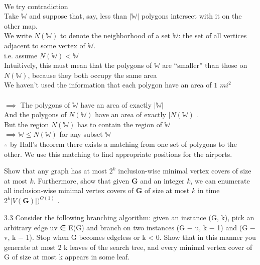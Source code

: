 \documentclass[11pt]{exam}
\begin{document}
\begin{questions}
\begin{solution}
    \\
    We try contradiction\\
    
    Take $\mathbb{W}$ and suppose that, say, less than $|\mathbb{W}|$ polygons intersect with it on the other map.\\
    We write $N(\mathbb{W})$ to denote the neighborhood of a set $\mathbb{W}$: the set of all vertices adjacent to some vertex of $\mathbb{W}$.\\
    i.e. assume $N(\mathbb{W}) < \mathbb{W}$\\
    Intuitively, this must mean that the polygons of $\mathbb{W}$ are “smaller” than those on $N(\mathbb{W})$, because they both occupy the same area\\
    We haven't used the information that each polygon have an area of $1$ $mi^2$\\\\
    $\implies$  The polygons of $\mathbb{W}$ have an area of exactly $|\mathbb{W}|$\\
    And the polygons of $N(\mathbb{W})$ have an area of exactly $|N(\mathbb{W})|$.\\
    But the region $N(\mathbb{W})$ has to contain the region of $\mathbb{W}$\\
    $\implies   \mathbb{W} \leq N(\mathbb{W})$ for any subset $\mathbb{W}$\\
    
    $\therefore$ by Hall’s theorem there exists a matching from one set of polygons to the other. We use this matching to find appropriate positions for the airports.
    
    
    
    
    
\end{solution}

\question Show that any graph has at most $2^k$ inclusion-wise minimal vertex covers of size at most
$k$. Furthermore, show that given $\pmb{G}$ and an integer $k$, we can enumerate all inclusion-wise
minimal vertex covers of $\pmb{G}$ of size at most $k$ in time $2^k|V(\pmb{G})|)^{O(1)}$ .
\begin{solution}
    3.3 Consider the following branching algorithm: given an instance (G, k), pick an arbitrary
edge uv ∈ E(G) and branch on two instances (G − u, k − 1) and (G − v, k − 1). Stop when
G becomes edgeless or k < 0. Show that in this manner you generate at most 2 k leaves
of the search tree, and every minimal vertex cover of G of size at most k appears in some
leaf.
\end{solution}


\end{questions}
\end{document}
